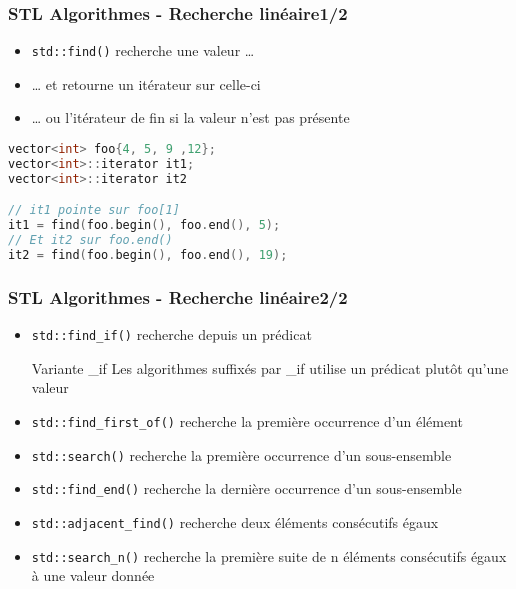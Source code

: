 \documentclass[C++.tex]{subfiles}
\begin{document}
\begin{frame}[fragile]
	\frametitle{STL Algorithmes - Recherche linéaire\titlehfill{}1/2}
	\begin{itemize}
		\item \lstinline|std::find()| recherche une valeur \ldots
		\item \ldots{} et retourne un itérateur sur celle-ci
		\item \ldots{} ou l'itérateur de fin si la valeur n'est pas présente
	\end{itemize}

	\begin{lstlisting}[language=C++]
vector<int> foo{4, 5, 9 ,12};
vector<int>::iterator it1;
vector<int>::iterator it2

// it1 pointe sur foo[1]
it1 = find(foo.begin(), foo.end(), 5);
// Et it2 sur foo.end()
it2 = find(foo.begin(), foo.end(), 19);\end{lstlisting}
\end{frame}

\begin{frame}[fragile]
	\frametitle{STL Algorithmes - Recherche linéaire\titlehfill{}2/2}
	\begin{itemize}
		\item \lstinline|std::find_if()| recherche depuis un prédicat

		\begin{block}{Variante \og \_if\fg{}}
			Les algorithmes suffixés par \_if utilise un prédicat plutôt qu'une valeur
		\end{block}

		\item \lstinline|std::find_first_of()| recherche la première occurrence d'un élément
		\item \lstinline|std::search()| recherche la première occurrence d'un sous-ensemble
		\item \lstinline|std::find_end()| recherche la dernière occurrence d'un sous-ensemble
		\item \lstinline|std::adjacent_find()| recherche deux éléments consécutifs égaux
		\item \lstinline|std::search_n()| recherche la première suite de n éléments consécutifs égaux à une valeur donnée

	\end{itemize}
\end{frame}
\end{document}
